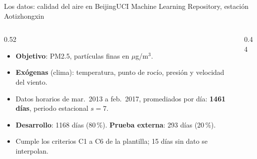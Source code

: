 \documentclass[aspectratio=169,10pt]{beamer}
\begin{document}
\begin{frame}{Los datos: calidad del aire en Beijing}{UCI Machine Learning Repository, estación Aotizhongxin}
  \begin{columns}[T,onlytextwidth]
    \begin{column}{0.52\textwidth}
      \begin{itemize}\setlength{\itemsep}{4pt}
        \item \textbf{Objetivo}: PM2.5, partículas finas en $\mu$g/m$^3$.
        \item \textbf{Exógenas} (clima): temperatura, punto de rocío, presión y velocidad del viento.
        \item Datos horarios de mar.\ 2013 a feb.\ 2017, promediados por día: \textbf{1461 días}, periodo estacional $s = 7$.
        \item \textbf{Desarrollo}: 1168 días (80\,\%). \textbf{Prueba externa}: 293 días (20\,\%).
        \item Cumple los criterios C1 a C6 de la plantilla; 15 días sin dato se interpolan.
      \end{itemize}
    \end{column}
    \begin{column}{0.44\textwidth}
      \vspace{0.15cm}
    \end{column}
  \end{columns}
\end{frame}
\end{document}
